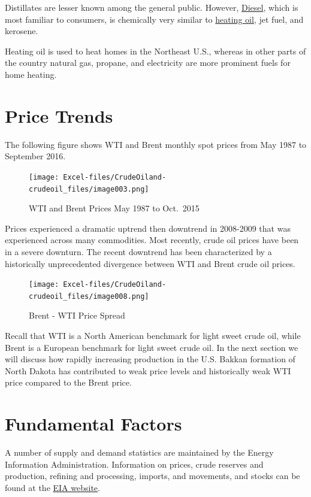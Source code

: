 \documentclass[
]{book}
\begin{document}
Distillates are lesser known among the general public. However, \href{http://www.eia.gov/Energyexplained/index.cfm?page=diesel_home}{Diesel}, which is most familiar to consumers, is chemically very similar to \href{http://www.eia.gov/Energyexplained/index.cfm?page=heating_oil_use}{heating oil}, jet fuel, and kerosene.

Heating oil is used to heat homes in the Northeast U.S., whereas in other parts of the country natural gas, propane, and electricity are more prominent fuels for home heating.

\hypertarget{price-trends}{%
\section{Price Trends}\label{price-trends}}

The following figure shows WTI and Brent monthly spot prices from May 1987 to September 2016.

\begin{figure}
\centering
\texttt{[image: Excel-files/CrudeOiland-crudeoil\_files/image003.png]}
\caption{WTI and Brent Prices May 1987 to Oct.~2015}
\end{figure}

Prices experienced a dramatic uptrend then downtrend in 2008-2009 that was experienced across many commodities. Most recently, crude oil prices have been in a severe downturn. The recent downtrend has been characterized by a historically unprecedented divergence between WTI and Brent crude oil prices.

\begin{figure}
\centering
\texttt{[image: Excel-files/CrudeOiland-crudeoil\_files/image008.png]}
\caption{Brent - WTI Price Spread}
\end{figure}

Recall that WTI is a North American benchmark for light sweet crude oil, while Brent is a European benchmark for light sweet crude oil. In the next section we will discuss how rapidly increasing production in the U.S. Bakkan formation of North Dakota has contributed to weak price levels and historically weak WTI price compared to the Brent price.

\hypertarget{fundamental-factors}{%
\section{Fundamental Factors}\label{fundamental-factors}}

A number of supply and demand statistics are maintained by the Energy Information Administration. Information on prices, crude reserves and production, refining and processing, imports, and movements, and stocks can be found at the \href{http://www.eia.gov/petroleum/data.cfm}{EIA website}.
\end{document}
